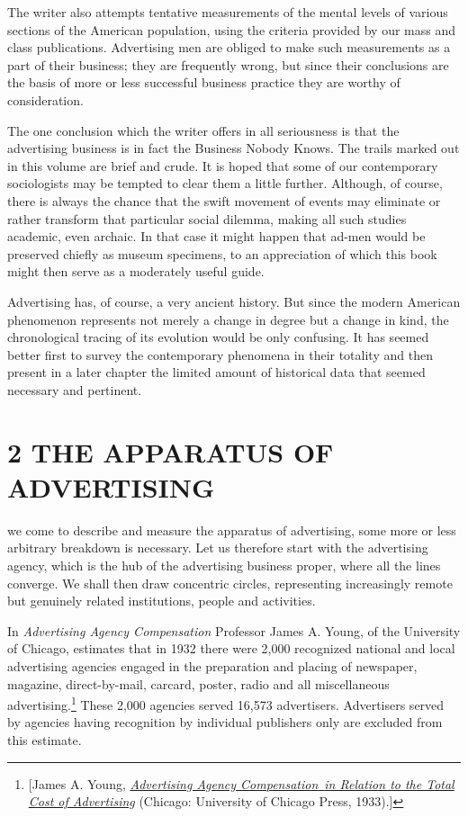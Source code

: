 \documentclass[twoside,nohyper,openany,nobib]{tufte-book}
\let\oldchapter\chapter
\def\chapter{%
  \setcounter{footnote}{0}%
  \oldchapter
}
\begin{document}
The writer also attempts tentative measurements of the mental levels of
various sections of the American population, using the criteria provided
by our mass and class publications. Advertising men are obliged to make
such measurements as a part of their business; they are frequently
wrong, but since their conclusions are the basis of more or less
successful business practice they are worthy of consideration.

The one conclusion which the writer offers in all seriousness is that
the advertising business is in fact the Business Nobody Knows. The
trails marked out in this volume are brief and crude. It is hoped that
some of our contemporary sociologists may be tempted to clear them a
little further. Although, of course, there is always the chance that the
swift movement of events may eliminate or rather transform that
particular social dilemma, making all such studies academic, even
archaic. In that case it might happen that ad-men would be preserved
chiefly as museum specimens, to an appreciation of which this book might
then serve as a moderately useful guide.

Advertising has, of course, a very ancient history. But since the modern
American phenomenon represents not merely a change in degree but a
change in kind, the chronological tracing of its evolution would be only
confusing. It has seemed better first to survey the contemporary
phenomena in their totality and then present in a later chapter the
limited amount of historical data that seemed necessary and pertinent.\\



\chapter[2 \hspace*{1mm} THE APPARATUS OF ADVERTISING]{2 THE APPARATUS OF ADVERTISING}

 we come to describe and measure the apparatus of advertising, some
more or less arbitrary breakdown is necessary. Let us therefore start
with the advertising agency, which is the hub of the advertising
business proper, where all the lines converge. We shall then draw
concentric circles, representing increasingly remote but genuinely
related institutions, people and activities.

In \emph{Advertising Agency Compensation} Professor James A. Young, of
the University of Chicago, estimates that in 1932 there were 2,000
recognized national and local advertising agencies engaged in the
preparation and placing of newspaper, magazine, direct-by-mail, carcard,
poster, radio and all miscellaneous advertising.\footnote{{[}James A. Young,
  \emph{\href{http://www.worldcat.org/oclc/3291593}{Advertising Agency
  Compensation}}\href{http://www.worldcat.org/oclc/3291593}{~}\emph{\href{http://www.worldcat.org/oclc/3291593}{in
  Relation to the Total Cost of Advertising}} (Chicago: University of
  Chicago Press, 1933).{]}} These 2,000 agencies
served 16,573 advertisers. Advertisers served by agencies having
recognition by individual publishers only are excluded from this
estimate.
\end{document}
